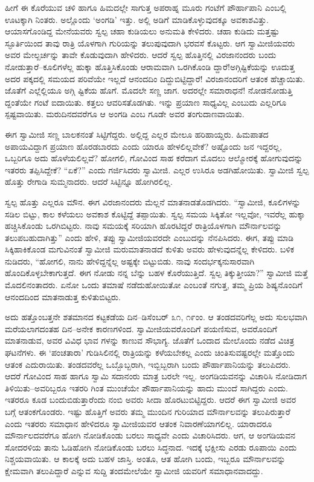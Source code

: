 ಹೀಗೆ ಈ ಕೊರೆಯುವ ಚಳಿ ಹಾಗೂ ಹಿಮದಲ್ಲೇ ಸಾಗುತ್ತ ಅಪರಾಹ್ನ ಮೂರು ಗಂಟೆಗೆ ಪೌರ್ಹಾಪಾನಿ ಎಂಬಲ್ಲಿ ಊಟಕ್ಕಾಗಿ ನಿಂತರು. ಅಲ್ಲೊಂದು ‘ಅಂಗಡಿ’ ಇತ್ತು. ಅಲ್ಲಿ ಅಡಿಗೆ ಮಾಡಿಕೊಳ್ಳುವುದಕ್ಕೂ ಅವಕಾಶವಿತ್ತು. ಆಯಾಸಗೊಂಡಿದ್ದ ಮೇನೆಯವರು ಸ್ವಲ್ಪ ಚಹಾ ಕುಡಿಯಲು ಅನುಮತಿ ಕೇಳಿದರು. ಚಹಾ ಕುಡಿದು ಮತ್ತಷ್ಟು ಸ್ಫೂರ್ತಿಯಿಂದ ತಾವು ರಾತ್ರಿ ಯೊಳಗಾಗಿ ಗುರಿಯನ್ನು ತಲುಪುವುದಾಗಿ ಭರವಸೆ ಕೊಟ್ಟರು. ಆಗ ಸ್ವಾಮೀಜಿಯವರು ಅವರ ಮೇಲ್ಖರ್ಚನ್ನು ತಾವೇ ಕೊಡುವುದಾಗಿ ಹೇಳಿದರು. ಆದರೆ ಸ್ವಲ್ಪ ಹೊತ್ತಿನಲ್ಲಿ ವಿರಜಾನಂದರು ಬಂದು ನೋಡುತ್ತಾರೆ–ಕೂಲಿಗಳೆಲ್ಲ ಹುಕ್ಕಾ ಹೊತ್ತಿಸಿಕೊಂಡು ಆರಾಮವಾಗಿ ಒರಗಿಕೊಂಡಿ ದ್ದಾರೆ!ಅಗ್ಗಿಷ್ಟಿಕೆಯನ್ನು ಊದುತ್ತ ಅದರ ಪಕ್ಕದಲ್ಲಿ ಸಮಯದ ಪರಿವೆಯೇ ಇಲ್ಲದೆ ಆನಂದದಿಂ ದಿದ್ದುಬಿಟ್ಟಿದ್ದಾರೆ! ವಿರಜಾನಂದರಿಗೆ ಆತಂಕ ಹೆಚ್ಚಾಯಿತು. ಜೊತೆಗೆ ಎಲ್ಲೆಲ್ಲಿಯೂ ಅಗ್ಗಿ ಷ್ಟಿಕೆಯ ಹೊಗೆ. ಮೊದಲೇ ಸಣ್ಣ ಜಾಗ. ಅದರಲ್ಲೇ ಸಮಾರಾಧನೆ! ನೋಡನೋಡುತ್ತಿ ದ್ದಂತೆಯೇ ಗಂಟೆ ಐದಾಯಿತು. ಕತ್ತಲು ಆವರಿಸತೊಡಗಿತು. ಇನ್ನು ಪ್ರಯಾಣ ಸಾಧ್ಯವಿಲ್ಲ ಎಂಬುದು ಎಲ್ಲರಿಗೂ ಸ್ಪಷ್ಟವಾಯಿತು. ಮರುದಿನದವರೆಗೂ ಆ ಅಂಗಡಿ ಎಂಬ ಗೂಡೇ ಅವರ ತಂಗುದಾಣವಾಯಿತು.

ಈಗ ಸ್ವಾಮೀಜಿ ಸಣ್ಣ ಬಾಲಕನಂತೆ ಸಿಟ್ಟಿಗೆದ್ದರು. ಅಲ್ಲಿದ್ದ ಎಲ್ಲರ ಮೇಲೂ ಹರಿಹಾಯ್ದರು. ಹಿಮಪಾತದ ಅಪಾಯವಿದ್ದಾಗ ಪ್ರಯಾಣ ಹೊರಡಬಾರದು ಎಂದು ಯಾರೂ ಹೇಳಲಿಲ್ಲವೇಕೆ? ಅಷ್ಟೊಂದು ಜನ ಇದ್ದರಲ್ಲ, ಒಬ್ಬರಿಗೂ ಅದು ಹೊಳೆಯಲಿಲ್ಲವೆ? ಹೋಗಲಿ, ಗೋವಿಂದ ಸಾಹ ಕರೆದಾಗ ಮೊದಲು ಆಲ್ಮೋರಕ್ಕೆ ಹೋಗುವುದನ್ನು ಇತರರು ತಪ್ಪಿಸಿದ್ದೇಕೆ? “ಏಕೆ?” ಎಂದು ಗರ್ಜಿಸಿದರು ಸ್ವಾಮೀಜಿ. ಎಲ್ಲರ ಉಸಿರೂ ಅಡಗಿಹೋಯಿತು. ಸ್ವಾಮೀಜಿ ಸ್ವಲ್ಪ ಹೊತ್ತು ರೇಗಾಡಿ ಸುಮ್ಮನಾದರು. ಆದರೆ ಸಿಟ್ಟಿನ್ನೂ ಹೋಗಿರಲಿಲ್ಲ.

ಸ್ವಲ್ಪ ಹೊತ್ತು ಎಲ್ಲರೂ ಮೌನ. ಈಗ ವಿರಜಾನಂದರು ಮೆಲ್ಲನೆ ಮಾತನಾಡತೊಡಗಿದರು. “ಸ್ವಾಮೀಜಿ, ಕೂಲಿಗಳನ್ನು ಸಡಿಲ ಬಿಟ್ಟು, ಕಾಲ ಕಳೆಯಲು ಅವಕಾಶ ಕೊಟ್ಟಿದ್ದೆ ತಪ್ಪಾಯಿತು. ಸ್ವಲ್ಪ ಸಮಯ ಸಿಕ್ಕಿತೋ ಇಲ್ಲವೋ, ಇವರೆಲ್ಲ ಹುಕ್ಕಾ ಹಚ್ಚಿಸಿಕೊಂಡು ಒರಗಿಬಿಟ್ಟರು. ನಾವು ಸಮಯಕ್ಕೆ ಸರಿಯಾಗಿ ಹೊರಟಿದ್ದರೆ ರಾತ್ರಿಯೊಳಗಾಗಿ ಮೌರ್ನಾಲವನ್ನು ತಲುಪಬಹುದಾಗಿತ್ತು” ಎಂದು ಹೇಳಿ, ತಪ್ಪು ಸ್ವಾಮೀಜಿಯವರದೇ ಎಂಬುದನ್ನು ನೆನಪಿಸಿದರು. ಈಗ, ತಪ್ಪು ಮಾಡಿ ಸಿಕ್ಕಿಹಾಕಿಕೊಂಡ ಮಗುವಿನಂತೆ ಸ್ವಾಮೀಜಿ ಮರುಮಾತನಾಡದೆ ಕುಳಿತು ಅವರು ಹೇಳುವುದನ್ನೆಲ್ಲ ಕೇಳಿದರು. ಬಳಿಕ ನುಡಿದರು, “ಹೋಗಲಿ, ನಾನು ಹೇಳಿದ್ದನ್ನೆಲ್ಲ ಅಷ್ಟಕ್ಕೇ ಬಿಟ್ಟುಬಿಡು. ನಾವು ಸಂದರ್ಭಕ್ಕನುಸಾರವಾಗಿ ಹೊಂದಿಕೊಳ್ಳಬೇಕಾಗುತ್ತದೆ. ಈಗ ನೋಡು ನನ್ನ ಬೆನ್ನು ಬಹಳ ಕೊರೆಯುತ್ತಿದೆ. ಸ್ವಲ್ಪ ತಿಕ್ಕುತ್ತೀಯಾ?” ಸ್ವಾಮೀಜಿ ಮತ್ತೆ ಮೊದಲಿನಂತಾದರು. ಏನೋ ಒಂದು ತಮಾಷೆ ನಡೆದುಹೋಯಿತೋ ಎಂಬಂತೆ ನಗುತ್ತ, ತಮ್ಮ ಪ್ರಿಯ ಶಿಷ್ಯನೊಂದಿಗೆ ಆನಂದದಿಂದ ಮಾತನಾಡುತ್ತ ಕುಳಿತುಬಿಟ್ಟರು.

ಅದು ಹತ್ತೊಂಬತ್ತನೇ ಶತಮಾನದ ಕಟ್ಟಕಡೆಯ ದಿನ–ಡಿಸೆಂಬರ್ ೩೧, ೧೯ಂಂ. ಆ ತಂಡದವರಿಗೆಲ್ಲ ಅದು ಸುಲಭವಾಗಿ ಮರೆಯಲಾಗದಂತಹ ದಿನ–ಅನೇಕ ಕಾರಣಗಳಿಂದ. ಸ್ವಾಮೀಜಿಯವರೊಂದಿಗೆ ಪಯಣಿಸುವ, ಅವರೊಂದಿಗೆ ಮಾತನಾಡುವ, ಅವರ ವಿವಿಧ ಭಾವ ಗಳನ್ನು ಕಾಣುವ ಸೌಭಾಗ್ಯ. ಜೊತೆಗೆ ಒಂದಾದ ಮೇಲೊಂದು ನಡೆದ ವಿಚಿತ್ರ ಘಟನೆಗಳು. ಈ ‘ಪಂಚತಾರಾ’ ಗುಡಿಸಿಲಿನಲ್ಲಿ ರಾತ್ರಿಯನ್ನು ಕಳೆಯಬೇಕಲ್ಲ ಎಂದು ಚಿಂತಿಸುವಷ್ಟರಲ್ಲೇ ಮತ್ತೊಂದು ಆತಂಕ ಎದುರಾಯಿತು. ತಂಡದವರೆಲ್ಲ ಒಬ್ಬೊಬ್ಬರಾಗಿ, ಇಬ್ಬಿಬ್ಬರಾಗಿ ಬಂದು ಪೌರ್ಹಾಪಾನಿಯನ್ನು ತಲುಪಿದರು. ಆದರೆ ಗೋವಿಂದ ಸಾಹ ಹಾಗೂ ಸ್ವಾಮಿ ಸದಾನಂರು ಮಾತ್ರ ಬರಲೇ ಇಲ್ಲ. ಅಂಗಡಿಯವನನ್ನು ವಿಚಾರಿಸಿ ನೋಡಿದಾಗ ತಿಳಿಯಿತು–ಅವರಿಬ್ಬರೂ ಇತರರಿ ಗಿಂತ ಮುಂಚೆಯೇ ಪೌರ್ಹಾಪಾನಿಯನ್ನು ಹಾದು ಮುಂದೆ ಸಾಗಿದ್ದರು ಎಂದು. ಇತರರೂ ಕೂಡ ಬಂದುಬಿಡುತ್ತಾರೆಂದು ನಂಬಿ ಅವರು ಸೀದಾ ಹೊರಟುಬಿಟ್ಟಿದ್ದರು. ಆದರೆ ಈಗ ಸ್ವಾಮೀಜಿ ಅವರ ಬಗ್ಗೆ ಆತಂಕಗೊಂಡರು. ಇಷ್ಟು ಹೊತ್ತಿಗೆ ಅವರು ತಮ್ಮ ಮುಂದಿನ ಗುರಿಯಾದ ಮೌರ್ನಾಲವನ್ನು ತಲುಪಿರುತ್ತಾರೆ ಎಂದು ಇತರರು ಸಮಾಧಾನ ಹೇಳಿದರೂ ಸ್ವಾಮೀಜಿಯವರ ಆತಂಕ ನಿವಾರಣೆಯಾಗಲಿಲ್ಲ. ಯಾರಾದರೂ ಮೌರ್ನಾಲದವರೆಗೂ ಹೋಗಿ ನೋಡಿಕೊಂಡು ಬರಲು ಸಾಧ್ಯವೇ ಎಂದು ವಿಚಾರಿಸಿದರು. ಆಗ, ಆ ಅಂಗಡಿಯವನ ಸೋದರಳಿಯ ತಾನು ಓಡಿಹೋಗಿ ನೋಡಿಕೊಂಡು ಬರಲು ಸಿದ್ಧನಾದ. ಇದಕ್ಕೆ ಭಕ್ಷೀಸು ಎರಡು ರೂಪಾಯಿ ಎಂದು ನಿಶ್ಚಯವಾಯಿತು. ಆ ಕಾಲಕ್ಕೆ ಅದು ಬಹಳ ಜಾಸ್ತಿ. ಅಂತೂ, ಆತ ಹೋಗಿ ಬಂದು, ಇಬ್ಬರೂ ಮೌರ್ನಾಲವನ್ನು ಕ್ಷೇಮವಾಗಿ ತಲುಪಿದ್ದಾರೆ ಎನ್ನುವ ಸುದ್ದಿ ತಂದಮೇಲೆಯೇ ಸ್ವಾಮೀಜಿ ಯವರಿಗೆ ಸಮಾಧಾನವಾದದ್ದು.

